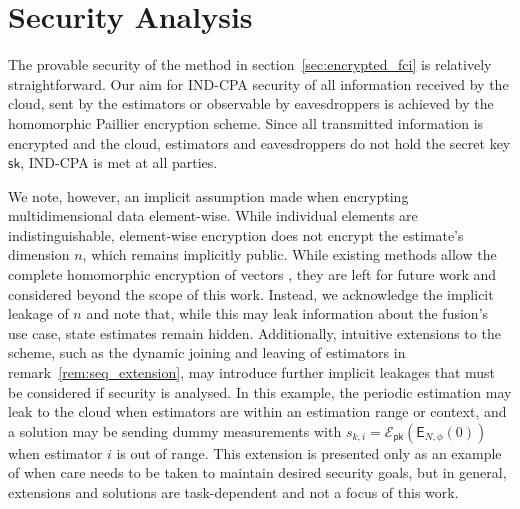 \documentclass[letterpaper, 10 pt, conference]{ieeeconf}
\begin{document}
% 
%                                 
%                                 
%                                 
% 
\section{Security Analysis}\label{sec:security}
The provable security of the method in section~\ref{sec:encrypted_fci} is relatively straightforward. Our aim for IND-CPA security of all information received by the cloud, sent by the estimators or observable by eavesdroppers is achieved by the homomorphic Paillier encryption scheme. Since all transmitted information is encrypted and the cloud, estimators and eavesdroppers do not hold the secret key $\mathsf{sk}$, IND-CPA is met at all parties.

We note, however, an implicit assumption made when encrypting multidimensional data element-wise. While individual elements are indistinguishable, element-wise encryption does not encrypt the estimate's dimension $n$, which remains implicitly public. While existing methods allow the complete homomorphic encryption of vectors \cite{alexandruPrivateWeightedSum2020}, they are left for future work and considered beyond the scope of this work. Instead, we acknowledge the implicit leakage of $n$ and note that, while this may leak information about the fusion's use case, state estimates remain hidden. Additionally, intuitive extensions to the scheme, such as the dynamic joining and leaving of estimators in remark~\ref{rem:seq_extension}, may introduce further implicit leakages that must be considered if security is analysed. In this example, the periodic estimation may leak to the cloud when estimators are within an estimation range or context, and a solution may be sending dummy measurements with $s_{k,i}=\mathcal{E}_{\mathsf{pk}}(\mathsf{E}_{N,\phi}(0))$ when estimator $i$ is out of range. This extension is presented only as an example of when care needs to be taken to maintain desired security goals, but in general, extensions and solutions are task-dependent and not a focus of this work.


% 
%                                 
%                                 
%                                 
% 
\end{document}
